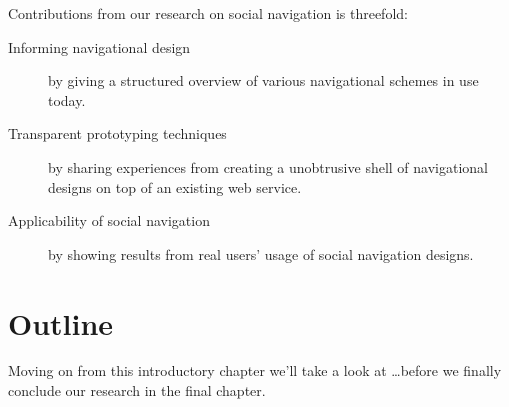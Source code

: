 Contributions from our research on social navigation is threefold:

\begin{description}
  \item[Informing navigational design] by giving a structured overview of
    various navigational schemes in use today.
  \item[Transparent prototyping techniques] by sharing experiences from
    creating a unobtrusive shell of navigational designs on top of an
    existing web service.
  \item[Applicability of social navigation] by showing results from real
    users' usage of social navigation designs.
\end{description}

\section{Outline}

Moving on from this introductory chapter we'll take a look at \ldots before we
finally conclude our research in the final chapter.
